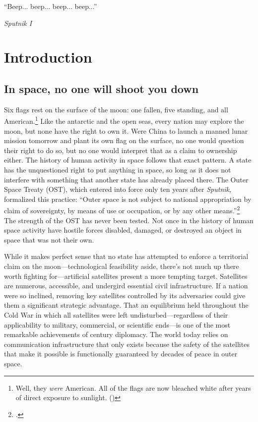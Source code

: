 \documentclass{memoir}
\begin{document}
\epigraph{``Beep... beep... beep... beep...''}{\emph{Sputnik I}}
\section{Introduction}
\subsection{In space, no one will shoot you down}
Six flags rest on the surface of the moon: one fallen, five standing, and all American.\footnote{Well, they \emph{were} American. All of the flags are now bleached white after years of direct exposure to sunlight. (\cite{spudis_faded_2011})} Like the antarctic and the open seas, every nation may explore the moon, but none have the right to own it. Were China to launch a manned lunar mission tomorrow and plant its own flag on the surface, no one would question their right to do so, but no one would interpret that as a claim to ownership either. The history of human activity in space follows that exact pattern. A state has the unquestioned right to put anything in space, so long as it does not interfere with something that another state has already placed there. The Outer Space Treaty (OST), which entered into force only ten years after \emph{Sputnik}, formalized this practice: ``Outer space \textelp{} is not subject to national appropriation by claim of sovereignty, by means of use or occupation, or by any other means.''\footcite{noauthor_outer_1966} The strength of the OST has never been tested. Not once in the history of human space activity have hostile forces disabled, damaged, or destroyed an object in space that was not their own.

While it makes perfect sense that no state has attempted to enforce a territorial claim on the moon---technological feasibility aside, there's not much up there worth fighting for---artificial satellites present a more tempting target. Satellites are numerous, accessible, and undergird essential civil infrastructure. If a nation were so inclined, removing key satellites controlled by its adversaries could give them a significant strategic advantage. That an equilibrium held throughout the Cold War in which all satellites were left undisturbed---regardless of their applicability to military, commercial, or scientific ends---is one of the most remarkable achievements of  century diplomacy. The world today relies on communication infrastructure that only exists because the safety of the satellites that make it possible is functionally guaranteed by decades of peace in outer space.
\end{document}
